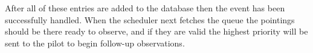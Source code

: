 \begin{colsection}
\begin{colsection}
After all of these entries are added to the database then the event has been successfully handled. When the scheduler next fetches the queue the pointings should be there ready to observe, and if they are valid the highest priority will be sent to the pilot to begin follow-up observations.

\end{colsection}


\end{colsection}

